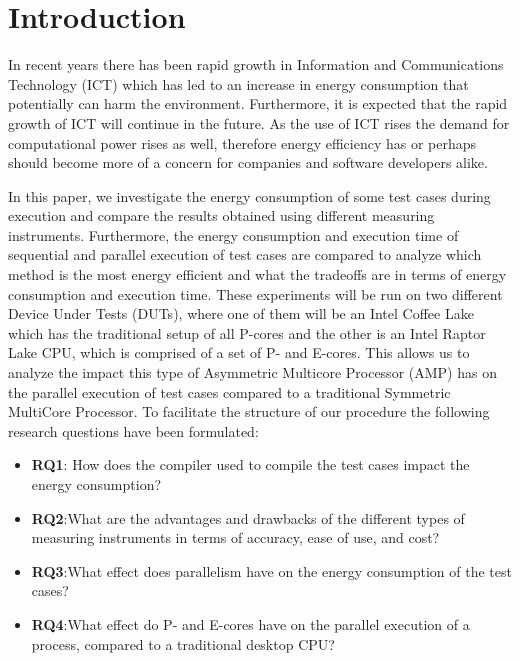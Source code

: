 \section{Introduction}

In recent years there has been rapid growth in Information and Communications Technology (ICT) which has led to an increase in energy consumption that potentially can harm the environment. Furthermore, it is expected that the rapid growth of ICT will continue in the future. \cite{jones2018stop,andrae2015global} As the use of ICT rises the demand for computational power rises as well, therefore energy efficiency has or perhaps should become more of a concern for companies and software developers alike.

In this paper, we investigate the energy consumption of some test cases during execution and compare the results obtained using different measuring instruments. Furthermore, the energy consumption and execution time of sequential and parallel execution of test cases are compared to analyze which method is the most energy efficient and what the tradeoffs are in terms of energy consumption and execution time. These experiments will be run on two different Device Under Tests (DUTs), where one of them will be an Intel Coffee Lake which has the traditional setup of all P-cores and the other is an Intel Raptor Lake CPU, which is comprised of a set of P- and E-cores. This allows us to analyze the impact this type of Asymmetric Multicore Processor (AMP) has on the parallel execution of test cases compared to a traditional Symmetric MultiCore Processor. To facilitate the structure of our procedure the following research questions have been formulated:

\begin{itemize}
    \item \textbf{RQ1}: How does the compiler used to compile the test cases impact the energy consumption?
    \item \textbf{RQ2}:What are the advantages and drawbacks of the different types of measuring instruments in terms of accuracy, ease of use, and cost?
    \item \textbf{RQ3}:What effect does parallelism have on the energy consumption of the test cases?
    \item \textbf{RQ4}:What effect do P- and E-cores have on the parallel execution of a process, compared to a traditional desktop CPU?
\end{itemize}

